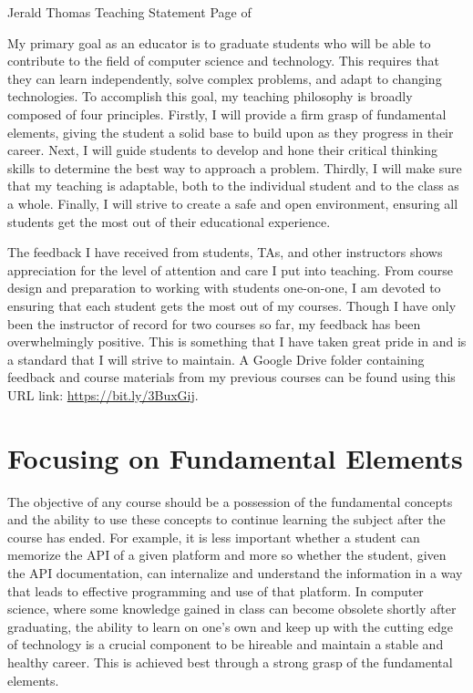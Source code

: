 \newpage

\setcounter{page}{1}
\makecvfooter
  {Jerald Thomas}
  {Teaching Statement}
  {Page \thepage \hspace{1pt} of \pageref{teaching_last}}


\makecvheader[C]


My primary goal as an educator is to graduate students who will be able to contribute to the field of computer science and technology. This requires that they can learn independently, solve complex problems, and adapt to changing technologies. To accomplish this goal, my teaching philosophy is broadly composed of four principles. Firstly, I will provide a firm grasp of fundamental elements, giving the student a solid base to build upon as they progress in their career. Next, I will guide students to develop and hone their critical thinking skills to determine the best way to approach a problem. Thirdly, I will make sure that my teaching is adaptable, both to the individual student and to the class as a whole. Finally, I will strive to create a safe and open environment, ensuring all students get the most out of their educational experience.

The feedback I have received from students, TAs, and other instructors shows appreciation for the level of attention and care I put into teaching. From course design and preparation to working with students one-on-one, I am devoted to ensuring that each student gets the most out of my courses. Though I have only been the instructor of record for two courses so far, my feedback has been overwhelmingly positive. This is something that I have taken great pride in and is a standard that I will strive to maintain. A Google Drive folder containing feedback and course materials from my previous courses can be found using this URL link: \url{https://bit.ly/3BuxGij}.

\section*{Focusing on Fundamental Elements}
\vspace{-0.25cm}
The objective of any course should be a possession of the fundamental concepts and the ability to use these concepts to continue learning the subject after the course has ended. For example, it is less important whether a student can memorize the API of a given platform and more so whether the student, given the API documentation, can internalize and understand the information in a way that leads to effective programming and use of that platform. In computer science, where some knowledge gained in class can become obsolete shortly after graduating, the ability to learn on one's own and keep up with the cutting edge of technology is a crucial component to be hireable and maintain a stable and healthy career. This is achieved best through a strong grasp of the fundamental elements.

